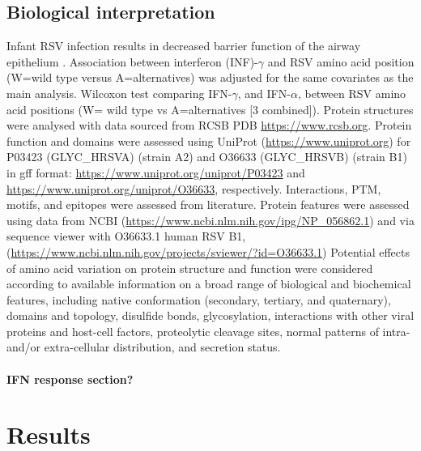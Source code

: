 \documentclass{article} %
\begin{document}
\subsection{Biological interpretation}
Infant RSV infection results in decreased barrier function of the airway epithelium
\citep{connelly2021metabolic}.
Association between interferon (INF)-$\gamma$ and RSV amino acid position (W=wild type versus A=alternatives) was adjusted for the same covariates as the main analysis.
Wilcoxon test comparing IFN-$\gamma$, and IFN-$\alpha$, between RSV amino acid positions (W= wild type vs A=alternatives [3 combined]).
Protein structures were analysed with data sourced from 
RCSB PDB \url{https://www.rcsb.org}.
Protein function and domains were assessed using 
UniProt	(\url{https://www.uniprot.org})
for P03423 (GLYC\_HRSVA) (strain A2) and O36633 (GLYC\_HRSVB) (strain B1) in gff format:
\url{https://www.uniprot.org/uniprot/P03423} and
\url{https://www.uniprot.org/uniprot/O36633}, respectively.
Interactions, PTM, motifs, and epitopes were assessed from literature. 
Protein features were assessed using data from NCBI
(\url{https://www.ncbi.nlm.nih.gov/ipg/NP_056862.1}) and
via sequence viewer with O36633.1 human RSV B1, 
(\url{https://www.ncbi.nlm.nih.gov/projects/sviewer/?id=O36633.1})
Potential effects of amino acid variation on protein structure and function were considered according to available information on a broad range of biological and biochemical features, including native conformation (secondary, tertiary, and quaternary), domains and topology, disulfide bonds, glycosylation, interactions with other viral proteins and host-cell factors, proteolytic cleavage sites, normal patterns of intra- and/or extra-cellular distribution, and secretion status.

\paragraph{IFN response section?}

\section{Results}
\end{document}
